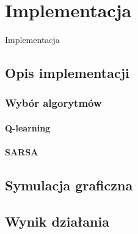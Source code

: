 \chapter{Implementacja}
\label{cha:implementacja}

Implementacja

\section{Opis implementacji}
\label{sec:opisimplementacji}

\subsection{Wybór algorytmów}
\label{subsec:wyboralgorytmow}

\subsubsection{Q-learning}
\label{subsubsec:qlearning}

\subsubsection{SARSA}
\label{subsubsec:sarsa}

\section{Symulacja graficzna}
\label{sec:symulacjagraficzna}

\section{Wynik działania}
\label{sec:wynikdzialania}
















